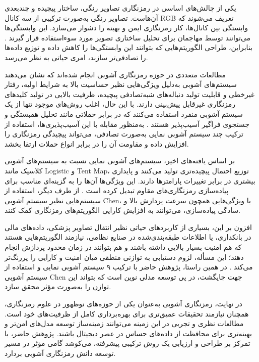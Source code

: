 یکی از چالش‌های اساسی در رمزنگاری تصاویر رنگی، ساختار پیچیده و چندبعدی آن‌هاست. تصاویر رنگی به‌صورت ترکیبی از سه کانال ‎RGB‎ تعریف می‌شوند که وابستگی بین کانال‌ها، کار رمزنگاری ایمن و بهینه را دشوار می‌سازد. این وابستگی‌ها می‌توانند توسط مهاجمان برای تحلیل ساختاری تصویر مورد سوءاستفاده قرار گیرند \cite{ref3}.  بنابراین، طراحی الگوریتم‌هایی که بتوانند این وابستگی‌ها را کاهش داده و توزیع داده‌ها را تصادفی‌تر سازند، امری حیاتی به نظر می‌رسد.

مطالعات متعددی در حوزه رمزنگاری آشوبی انجام شده‌اند که نشان می‌دهند سیستم‌های آشوبی به‌دلیل ویژگی‌هایی نظیر حساسیت بالا به شرایط اولیه، رفتار غیرخطی و قابلیت تولید دنباله‌های شبه‌تصادفی پیچیده، ظرفیت بالایی در تولید کلیدهای رمزنگاری غیرقابل پیش‌بینی دارند. با این حال، اغلب روش‌های موجود تنها از یک سیستم آشوبی منفرد استفاده می‌کنند که در برابر حملاتی مانند تحلیل همبستگی و جستجوی فراگیر آسیب‌پذیر هستند \cite{ref12}.  به‌منظور مقابله با این آسیب‌پذیری‌ها، استفاده از ترکیب چند سیستم آشوبی نمایی به‌صورت تصادفی، می‌تواند پیچیدگی رمزنگاری را افزایش داده و مقاومت آن را در برابر انواع حملات ارتقا بخشد.

بر اساس یافته‌های اخیر، سیستم‌های آشوبی نمایی نسبت به سیستم‌های آشوبی کلاسیک مانند ‎Logistic‎ و ‎Tent‎ ‎Map‎، توزیع احتمال پیچیده‌تری تولید می‌کنند و پایداری بیشتری در برابر تغییرات پارامترها دارند. این ویژگی‌ها آن‌ها را به گزینه‌ای مناسب برای پیاده‌سازی رمزنگاری‌های مقاوم تبدیل کرده است \cite{ref5}. از طرف دیگر، استفاده از سیستم‌هایی نظیر سیستم آشوبی ‎Chen‎، با ویژگی‌هایی همچون سرعت پردازش بالا و سادگی پیاده‌سازی، می‌توانند به افزایش کارایی الگوریتم‌های رمزنگاری کمک کنند.

افزون بر این، بسیاری از کاربردهای حیاتی نظیر انتقال تصاویر پزشکی، داده‌های مالی در بانکداری، یا اطلاعات طبقه‌بندی‌شده در صنایع نظامی، نیازمند الگوریتم‌هایی هستند که هم امنیت بسیار بالایی داشته باشند و هم بتوانند در زمان محدود پردازش انجام دهند؛ این مسأله، لزوم دستیابی به توازنی منطقی میان امنیت و کارایی را پررنگ‌تر می‌کند \cite{ref5}. در همین راستا، پژوهش حاضر با ترکیب ۹ سیستم آشوبی نمایی و استفاده از سیستم آشوبی ‎Chen‎ جهت جایگشت، در پی توسعه مدلی نوین است که بتواند این توازن را به‌صورت مؤثر محقق سازد.

در نهایت، رمزنگاری آشوبی به‌عنوان یکی از حوزه‌های نوظهور در علوم رمزنگاری، همچنان نیازمند تحقیقات عمیق‌تری برای بهره‌برداری کامل از ظرفیت‌های خود است. مطالعات نظری و تجربی در این زمینه می‌توانند زمینه‌ساز توسعه مدل‌های امن‌تر و بهینه‌تری برای محافظت از داده‌های حساس در عصر دیجیتال باشند. پژوهش حاضر، با تمرکز بر طراحی و ارزیابی یک روش ترکیبی پیشرفته، می‌کوشد گامی مؤثر در مسیر توسعه دانش رمزنگاری آشوبی بردارد.

